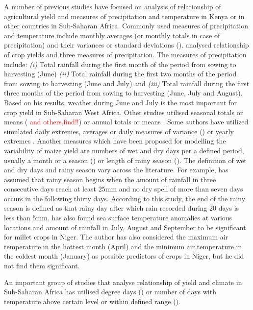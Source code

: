 \documentclass[a4paper,12pt]{article}
\begin{document}
 
A number of previous studies have focused on analysis of relationship of agricultural yield and measures of precipitation and temperature in Kenya or in other countries in Sub-Saharan Africa. Commonly used measures of precipitation and temperature include monthly averages (or monthly totals in case of precipitation) and their variances or standard deviations (\citealt{AbrahaSavage2006, LobellEtAl2008, ThorntonEtAl2009}). \cite{Adejuwon2004} analysed relationship of crop yields and three measures of precipitation. The measures of precipitation include: \textit{(i)} Total rainfall during the first month of the period from sowing to harvesting (June) \textit{(ii)} Total rainfall during the first two months of the period from sowing to harvesting (June and July) and \textit{(iii)} Total rainfall during the first three months of the period from sowing to harvesting (June, July and August). Based on his results, weather during June and July is the most important for crop yield in Sub-Saharan West Africa. Other studies utilised seasonal totals or means (\citealt{sagoe2006,LobellBurke2010} \textcolor{red}{and others,find!!}) or annual totals or means \citep{BLIGNAUT2009}.  Some authors have utilized simulated daily extremes, averages or daily measures of variance  (\citealt{SchulzeEtA1993,Chipanshi2003,AbrahaSavage2006}) or yearly extremes \citep{sagoe2006}. Another measures which have been proposed for modelling the variability of maize yield are numbers of wet and dry days per a defined period, usually a month or a season (\citealt{BenMohamed2002,AbrahaSavage2006,sagoe2006,Giannakopoulos2009}) or length of rainy season (\citealt{Leemans1993,BenMohamed2002}). The definition of wet and dry days and rainy season vary across the literature. For example, \cite{BenMohamed2002} has assumed that rainy season begins when the amount of rainfall in three consecutive days reach at least 25mm and no dry spell of more than seven days occurs in the following thirty days. According to this study, the end of the rainy season is defined as that rainy day after which rain recorded during 20 days is less than 5mm. \cite{BenMohamed2002} has also found sea surface temperature anomalies at various locations and amount of rainfall in July, August and September to be significant for millet crops in Niger. The author has also considered the maximum air temperature in the hottest month (April) and the minimum air temperature in the coldest month (January) as possible predictors of crops in Niger, but he did not find them significant.

An important group of studies that analyse relationship of yield and climate in Sub-Saharan Africa has utilised degree days (\citealt{SchulzeEtA1993,TingemEtAl2008,WalkerSchulze2008,TingemEtAl2009}) or number of days with temperature above certain level or within defined range (\citealt{Giannakopoulos2009,LauxEtAl}).
\end{document}
